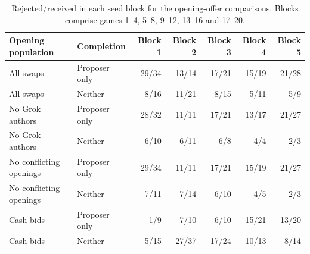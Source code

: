 \begin{table}[ht]\centering\small
\begin{tabular}{@{}llrrrrr@{}}\toprule
Opening population & Completion & Block 1 & Block 2 & Block 3 & Block 4 & Block 5\\\midrule
All swaps & Proposer only & 29/34 & 13/14 & 17/21 & 15/19 & 21/28 \\
All swaps & Neither & 8/16 & 11/21 & 8/15 & 5/11 & 5/9 \\
No Grok authors & Proposer only & 28/32 & 11/11 & 17/21 & 13/17 & 21/27 \\
No Grok authors & Neither & 6/10 & 6/11 & 6/8 & 4/4 & 2/3 \\
No conflicting openings & Proposer only & 29/34 & 11/11 & 17/21 & 15/19 & 21/27 \\
No conflicting openings & Neither & 7/11 & 7/14 & 6/10 & 4/5 & 2/3 \\
Cash bids & Proposer only & 1/9 & 7/10 & 6/10 & 15/21 & 13/20 \\
Cash bids & Neither & 5/15 & 27/37 & 17/24 & 10/13 & 8/14 \\
\bottomrule\end{tabular}
\caption{Rejected/received in each seed block for the opening-offer comparisons. Blocks comprise games 1--4, 5--8, 9--12, 13--16 and 17--20.}\label{tab:block-counts}
\end{table}
